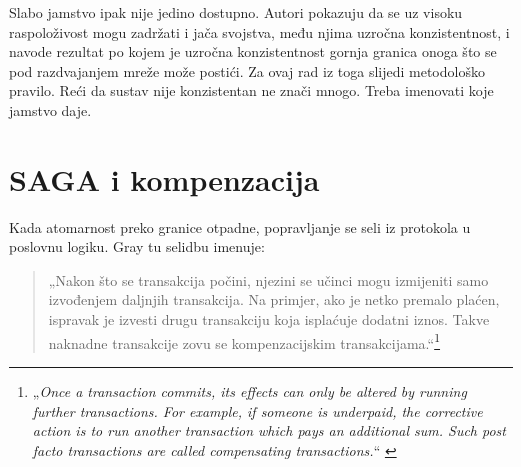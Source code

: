 Slabo jamstvo ipak nije jedino dostupno. Autori pokazuju da se uz visoku
raspoloživost mogu zadržati i jača svojstva, među njima uzročna
konzistentnost, i navode rezultat po kojem je uzročna konzistentnost gornja
granica onoga što se pod razdvajanjem mreže može postići. Za ovaj rad iz
toga slijedi metodološko pravilo. Reći da sustav nije konzistentan ne znači
mnogo. Treba imenovati koje jamstvo daje.


\section{SAGA i kompenzacija}
\label{sec:saga}

Kada atomarnost preko granice otpadne, popravljanje se seli iz protokola u
poslovnu logiku. Gray tu selidbu imenuje\cite{gray1981transaction}:

\begin{quote}
„Nakon što se transakcija počini, njezini se učinci mogu izmijeniti samo
izvođenjem daljnjih transakcija. Na primjer, ako je netko premalo plaćen,
ispravak je izvesti drugu transakciju koja isplaćuje dodatni iznos. Takve
naknadne transakcije zovu se kompenzacijskim
transakcijama.“\footnote{„\emph{Once a transaction commits, its effects can
only be altered by running further transactions. For example, if someone is
underpaid, the corrective action is to run another transaction which pays an
additional sum. Such post facto transactions are called compensating
transactions.}“ \cite{gray1981transaction}} \end{quote}

